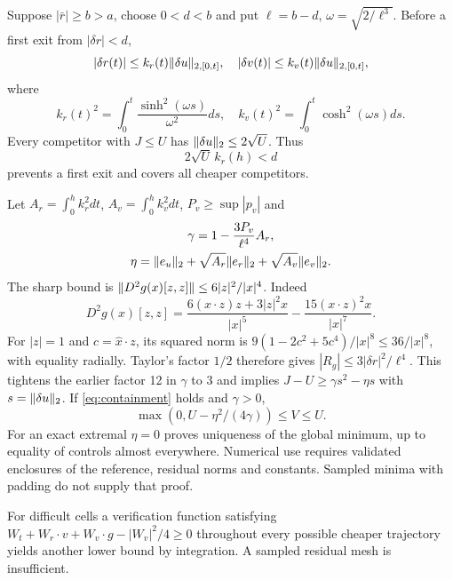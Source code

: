 Suppose $|\bar r|\ge b>a$, choose $0<d<b$ and put
$\ell=b-d$, $\omega=\sqrt{2/\ell^3}$.
Before a first exit from $|\delta r|<d$,
\begin{equation}
 |\delta r(t)|\le k_r(t)\lVert\delta u\rVert_{2,[0,t]},\quad
 |\delta v(t)|\le k_v(t)\lVert\delta u\rVert_{2,[0,t]},
\end{equation}
where
\begin{equation}
 k_r(t)^2=\int_0^t\frac{\sinh^2(\omega s)}{\omega^2}ds,\quad
 k_v(t)^2=\int_0^t\cosh^2(\omega s)ds.
\end{equation}
Every competitor with $J\le U$ has
$\lVert\delta u\rVert_2\le2\sqrt U$. Thus
\begin{equation}
 2\sqrt U\,k_r(h)<d
 \label{eq:containment}
\end{equation}
prevents a first exit and covers all cheaper competitors.

Let $A_r=\int_0^h k_r^2dt$, $A_v=\int_0^h k_v^2dt$,
$P_v\ge\sup|p_v|$ and
\begin{equation}
 \begin{gathered}
 \gamma=1-\frac{3P_v}{\ell^4}A_r,\\
 \eta=\lVert e_u\rVert_2+\sqrt{A_r}\lVert e_r\rVert_2+
                    \sqrt{A_v}\lVert e_v\rVert_2.
 \end{gathered}
\end{equation}
The sharp bound is $\lVert D^2g(x)[z,z]\rVert\le6|z|^2/|x|^4$.
Indeed
\[
D^2g(x)[z,z]=\frac{6(x\cdot z)z+3|z|^2x}{|x|^5}
             -\frac{15(x\cdot z)^2x}{|x|^7}.
\]
For $|z|=1$ and $c=\hat x\cdot z$, its squared norm is
$9(1-2c^2+5c^4)/|x|^8\le36/|x|^8$, with equality radially.
Taylor's factor $1/2$ therefore gives $|R_g|\le3|\delta r|^2/\ell^4$.
This tightens the earlier factor 12 in $\gamma$ to 3 and implies $J-U\ge\gamma s^2-\eta s$ with $s=\lVert\delta u\rVert_2$.
If \eqref{eq:containment} holds and $\gamma>0$,
\begin{equation}
 \boxed{\max(0,U-\eta^2/(4\gamma))\le V\le U.}
 \label{eq:tubegap}
\end{equation}
For an exact extremal $\eta=0$ proves uniqueness of the global
minimum, up to equality of controls almost everywhere. Numerical
use requires validated enclosures of the reference, residual norms
and constants. Sampled minima with padding do not supply that proof.

For difficult cells a verification function satisfying
$W_t+W_r\cdot v+W_v\cdot g-|W_v|^2/4\ge0$
throughout every possible cheaper trajectory yields another lower
bound by integration. A sampled residual mesh is insufficient.

